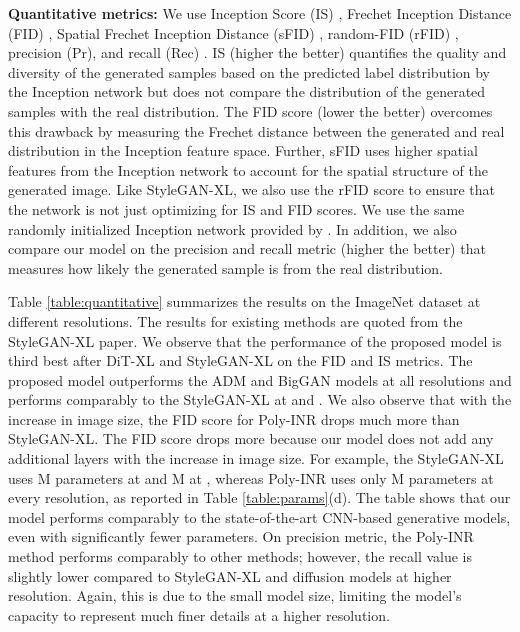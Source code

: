 \noindent \textbf{Quantitative metrics:} We use Inception Score (IS) \cite{salimans2016improved}, Frechet Inception Distance (FID) \cite{heusel2017gans}, Spatial Frechet Inception Distance (sFID) \cite{nash2021generating}, random-FID (rFID) \cite{sauer2022stylegan}, precision (Pr), and recall (Rec) \cite{kynkaanniemi2019improved}. IS (higher the better) quantifies the quality and diversity of the generated samples based on the predicted label distribution by the Inception network but does not compare the distribution of the generated samples with the real distribution. The FID score  (lower the better) overcomes this drawback by measuring the Frechet distance between the generated and real distribution in the Inception feature space. Further, sFID uses higher spatial features from the Inception network to account for the spatial structure of the generated image. Like StyleGAN-XL, we also use the rFID score to ensure that the network is not just optimizing for IS and FID scores. We use the same randomly initialized Inception network provided by \cite{sauer2022stylegan}. In addition, we also compare our model on the precision and recall metric (higher the better) that measures how likely the generated sample is from the real distribution.

Table \ref{table:quantitative} summarizes the results on the ImageNet dataset at different resolutions. The results for existing methods are quoted from the StyleGAN-XL paper. We observe that the performance of the proposed model is third best after DiT-XL and StyleGAN-XL on the FID and IS metrics. The proposed model outperforms the ADM and BigGAN models at all resolutions and performs comparably to the StyleGAN-XL at  and . We also observe that with the increase in image size, the FID score for Poly-INR drops much more than StyleGAN-XL. The FID score drops more because our model does not add any additional layers with the increase in image size. For example, the StyleGAN-XL uses M parameters at  and M at , whereas Poly-INR uses only M parameters at every resolution, as reported in Table \ref{table:params}(d). The table shows that our model performs comparably to the state-of-the-art CNN-based generative models, even with significantly fewer parameters. On precision metric, the Poly-INR method performs comparably to other methods; however, the recall value is slightly lower compared to StyleGAN-XL and diffusion models at higher resolution. Again, this is due to the small model size, limiting the model's capacity to represent much finer details at a higher resolution. 

